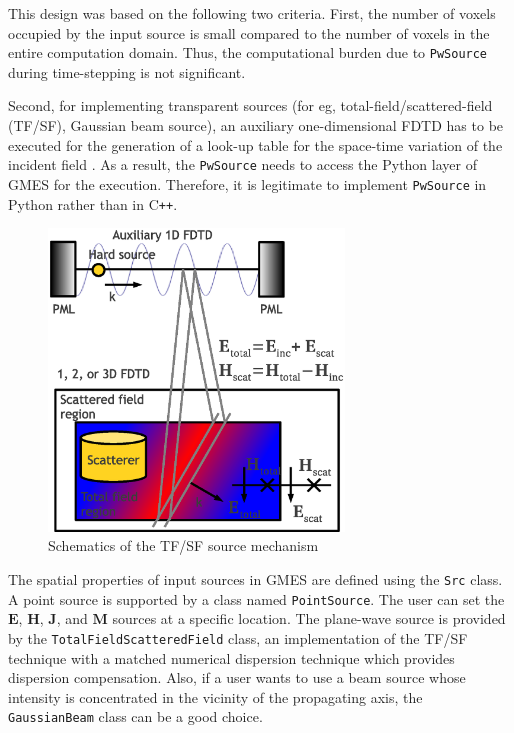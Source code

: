 This design was based on the following two criteria. First, the number of voxels occupied by the input source is small compared to the number of voxels in the entire computation domain. Thus, the computational burden due to \texttt{PwSource} during time-stepping is not significant. 

Second, for implementing transparent sources (for eg, total-field/scattered-field (TF/SF), Gaussian beam source), an auxiliary one-dimensional FDTD has to be executed for the generation of a look-up table for the space-time variation of the incident field \cite{merewether_implementing_1980,mur_absorbing_1981,umashankar_novel_1982}. As a result, the \texttt{PwSource} needs to access the Python layer of GMES for the execution. Therefore, it is legitimate to implement \texttt{PwSource} in Python rather than in C\verb!++!.  

\begin{figure}[hp!]
  \centering
  \includegraphics[width=0.7\textwidth]{figure/tfsf_scheme}
  \caption{Schematics of the TF/SF source mechanism}
  \label{fig:tfsf_scheme}
\end{figure}

The spatial properties of input sources in GMES are defined using the \texttt{Src} class. A point source is supported by a class named \texttt{PointSource}. The user can set the $\mathbf E$, $\mathbf H$, $\mathbf J$, and $\mathbf M$ sources at a specific location. The plane-wave source is provided by the \texttt{TotalFieldScatteredField} class, an implementation of the TF/SF technique with a matched numerical dispersion technique \cite{guiffaut_perfect_2000} which provides dispersion compensation. Also, if a user wants to use a beam source whose intensity is concentrated in the vicinity of the propagating axis, the \texttt{GaussianBeam} class can be a good choice. 

